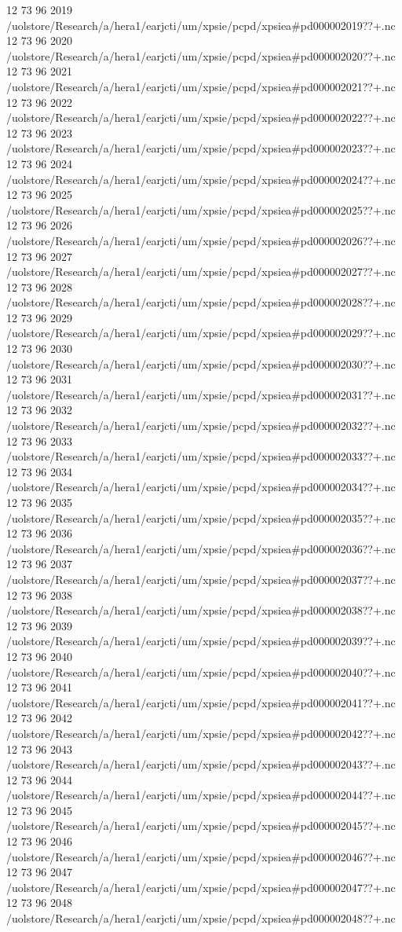 12 73 96
2019
/uolstore/Research/a/hera1/earjcti/um/xpsie/pcpd/xpsiea#pd000002019??+.nc
12 73 96
2020
/uolstore/Research/a/hera1/earjcti/um/xpsie/pcpd/xpsiea#pd000002020??+.nc
12 73 96
2021
/uolstore/Research/a/hera1/earjcti/um/xpsie/pcpd/xpsiea#pd000002021??+.nc
12 73 96
2022
/uolstore/Research/a/hera1/earjcti/um/xpsie/pcpd/xpsiea#pd000002022??+.nc
12 73 96
2023
/uolstore/Research/a/hera1/earjcti/um/xpsie/pcpd/xpsiea#pd000002023??+.nc
12 73 96
2024
/uolstore/Research/a/hera1/earjcti/um/xpsie/pcpd/xpsiea#pd000002024??+.nc
12 73 96
2025
/uolstore/Research/a/hera1/earjcti/um/xpsie/pcpd/xpsiea#pd000002025??+.nc
12 73 96
2026
/uolstore/Research/a/hera1/earjcti/um/xpsie/pcpd/xpsiea#pd000002026??+.nc
12 73 96
2027
/uolstore/Research/a/hera1/earjcti/um/xpsie/pcpd/xpsiea#pd000002027??+.nc
12 73 96
2028
/uolstore/Research/a/hera1/earjcti/um/xpsie/pcpd/xpsiea#pd000002028??+.nc
12 73 96
2029
/uolstore/Research/a/hera1/earjcti/um/xpsie/pcpd/xpsiea#pd000002029??+.nc
12 73 96
2030
/uolstore/Research/a/hera1/earjcti/um/xpsie/pcpd/xpsiea#pd000002030??+.nc
12 73 96
2031
/uolstore/Research/a/hera1/earjcti/um/xpsie/pcpd/xpsiea#pd000002031??+.nc
12 73 96
2032
/uolstore/Research/a/hera1/earjcti/um/xpsie/pcpd/xpsiea#pd000002032??+.nc
12 73 96
2033
/uolstore/Research/a/hera1/earjcti/um/xpsie/pcpd/xpsiea#pd000002033??+.nc
12 73 96
2034
/uolstore/Research/a/hera1/earjcti/um/xpsie/pcpd/xpsiea#pd000002034??+.nc
12 73 96
2035
/uolstore/Research/a/hera1/earjcti/um/xpsie/pcpd/xpsiea#pd000002035??+.nc
12 73 96
2036
/uolstore/Research/a/hera1/earjcti/um/xpsie/pcpd/xpsiea#pd000002036??+.nc
12 73 96
2037
/uolstore/Research/a/hera1/earjcti/um/xpsie/pcpd/xpsiea#pd000002037??+.nc
12 73 96
2038
/uolstore/Research/a/hera1/earjcti/um/xpsie/pcpd/xpsiea#pd000002038??+.nc
12 73 96
2039
/uolstore/Research/a/hera1/earjcti/um/xpsie/pcpd/xpsiea#pd000002039??+.nc
12 73 96
2040
/uolstore/Research/a/hera1/earjcti/um/xpsie/pcpd/xpsiea#pd000002040??+.nc
12 73 96
2041
/uolstore/Research/a/hera1/earjcti/um/xpsie/pcpd/xpsiea#pd000002041??+.nc
12 73 96
2042
/uolstore/Research/a/hera1/earjcti/um/xpsie/pcpd/xpsiea#pd000002042??+.nc
12 73 96
2043
/uolstore/Research/a/hera1/earjcti/um/xpsie/pcpd/xpsiea#pd000002043??+.nc
12 73 96
2044
/uolstore/Research/a/hera1/earjcti/um/xpsie/pcpd/xpsiea#pd000002044??+.nc
12 73 96
2045
/uolstore/Research/a/hera1/earjcti/um/xpsie/pcpd/xpsiea#pd000002045??+.nc
12 73 96
2046
/uolstore/Research/a/hera1/earjcti/um/xpsie/pcpd/xpsiea#pd000002046??+.nc
12 73 96
2047
/uolstore/Research/a/hera1/earjcti/um/xpsie/pcpd/xpsiea#pd000002047??+.nc
12 73 96
2048
/uolstore/Research/a/hera1/earjcti/um/xpsie/pcpd/xpsiea#pd000002048??+.nc
